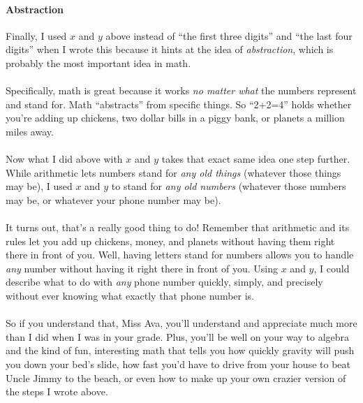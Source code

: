 \documentclass[a4paper,12pt]{scrartcl}
\begin{document}
\paragraph{Abstraction}
Finally, I used $x$ and $y$ above instead of ``the first three digits'' and ``the last four 
digits'' when I wrote this because it hints at the idea of \emph{abstraction}, 
which is probably the most important idea in math.
\\
\\
Specifically, math is great because it works \emph{no matter what} the numbers 
represent and stand for. Math ``abstracts'' from specific things. So
``2+2=4'' holds whether you're adding up chickens, two dollar bills in
a piggy bank, or planets a million miles away. 
\\
\\
Now what I did above with $x$ and $y$ takes that exact same idea one step further.  
While arithmetic lets numbers stand
for \emph{any old things} (whatever those things may be), I used $x$ and 
$y$ to stand for \emph{any old numbers} (whatever those numbers may be, or
whatever your phone number may be).
\\
\\
It turns out, that's a really good thing to do! Remember that arithmetic 
and its rules let you add up chickens, money, and planets without having them 
right there in front of you. Well, having letters 
stand for numbers allows you
to handle \emph{any} number without having it right
there in front of you.  Using $x$ and $y$, I could describe what to
do with \emph{any} phone number quickly, simply, and precisely without
ever knowing what exactly that phone number is. 
\\
\\
So if you understand that, Miss Ava, you'll understand and appreciate
much more than I did when I was in your grade.  Plus, you'll be well on your
way to algebra and the kind of fun, interesting math that
tells you how quickly gravity will push you down your bed's slide,
how fast you'd have to drive from your house to beat Uncle
Jimmy to the beach,
or even how to make up your own crazier version of the steps I
wrote above. 

    
\end{document}
